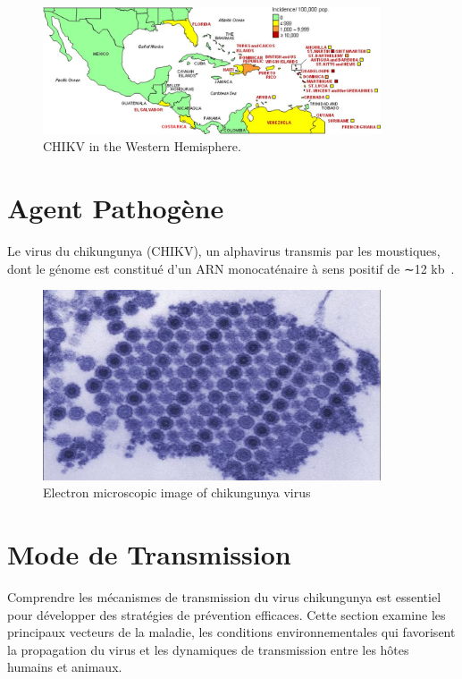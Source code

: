 \begin{figure}[!h]
	\begin{center}
		\includegraphics[width=10cm]{images/zjv9990995820001}
	\end{center}
	\caption{CHIKV in the Western Hemisphere.}
	\label{fig:chikvwestern}
\end{figure}

\section{Agent Pathogène}
Le virus du chikungunya (CHIKV), un alphavirus transmis par les moustiques, dont le génome est constitué d'un ARN monocaténaire à sens positif de ∼12 kb~\cite{JournalofVirology}.
\begin{figure}[!h]
	\begin{center}
		\includegraphics[width=10cm]{images/CHIK_17550_TEM}
	\end{center}
	\caption{Electron microscopic image of chikungunya virus}
	\label{fig:chikv} 
\end{figure}

\section{Mode de Transmission}
Comprendre les mécanismes de transmission du virus chikungunya est essentiel pour développer des stratégies de prévention efficaces. Cette section examine les principaux vecteurs de la maladie, les conditions environnementales qui favorisent la propagation du virus et les dynamiques de transmission entre les hôtes humains et animaux.
